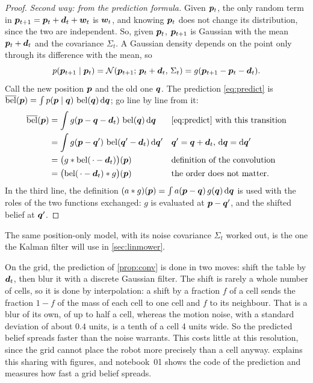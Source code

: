 \begin{proof}
\emph{Second way: from the prediction formula.} Given $\bm{p}_t$, the only
random term in $\bm{p}_{t+1}=\bm{p}_t+\bm{d}_t+\bm{w}_t$ is $\bm{w}_t$, and knowing
$\bm{p}_t$ does not change its distribution, since the two are independent.
So, given $\bm{p}_t$, $\bm{p}_{t+1}$ is Gaussian with the mean $\bm{p}_t+\bm{d}_t$
and the covariance $\Sigma_t$. A Gaussian density depends on the point
only through its difference with the mean, so
\[
  p(\bm{p}_{t+1}\mid\bm{p}_t)=\mathcal{N}(\bm{p}_{t+1};\,\bm{p}_t+\bm{d}_t,\,\Sigma_t)
  =g(\bm{p}_{t+1}-\bm{p}_t-\bm{d}_t).
\]
Call the new position $\bm{p}$ and the old one $\bm{q}$. The prediction
\eqref{eq:predict} is
$\overline{\operatorname{bel}}(\bm{p})=\int p(\bm{p}\mid\bm{q})\,\operatorname{bel}(\bm{q})\,\mathrm d\bm{q}$;
go line by line from it:
\begin{align*}
  \overline{\operatorname{bel}}(\bm{p})
  &=\int g(\bm{p}-\bm{q}-\bm{d}_t)\,\operatorname{bel}(\bm{q})\,\mathrm d\bm{q}
  &&\text{\eqref{eq:predict} with this transition}\\
  &=\int g(\bm{p}-\bm{q}')\,\operatorname{bel}(\bm{q}'-\bm{d}_t)\,\mathrm d\bm{q}'
  &&\text{$\bm{q}'=\bm{q}+\bm{d}_t$, $\mathrm d\bm{q}=\mathrm d\bm{q}'$}\\
  &=\bigl(g\ast\operatorname{bel}(\,\cdot-\bm{d}_t)\bigr)(\bm{p})
  &&\text{definition of the convolution}\\
  &=\bigl(\operatorname{bel}(\,\cdot-\bm{d}_t)\ast g\bigr)(\bm{p})
  &&\text{the order does not matter.}
\end{align*}
In the third line, the definition $(a\ast g)(\bm{p})=\int a(\bm{p}-\bm{q})\,
g(\bm{q})\,\mathrm d\bm{q}$ is used with the roles of the two functions
exchanged: $g$ is evaluated at $\bm{p}-\bm{q}'$, and the shifted belief at
$\bm{q}'$.
\end{proof}

The same position-only model, with its noise covariance $\Sigma_t$
worked out, is the one the Kalman filter will use in
\cref{sec:linmower}.

On the grid, the prediction of \cref{prop:conv} is done in two moves:
shift the table by $\bm{d}_t$, then blur it with a discrete Gaussian
filter. The shift is rarely a whole number of cells, so it is done by
interpolation: a shift by a fraction $f$ of a cell sends the fraction
$1-f$ of the mass of each cell to one cell and $f$ to its neighbour. That
is a blur of its own, of up to half a cell, whereas the motion noise, with
a standard deviation of about $0.4$ units, is a tenth of a cell 4 units
wide. So the predicted belief spreads faster than the noise warrants.
This costs little at this resolution, since the grid cannot place the
robot more precisely than a cell anyway.  explains
this sharing with figures, and notebook~01 shows the code of the
prediction and measures how fast a grid belief spreads.


